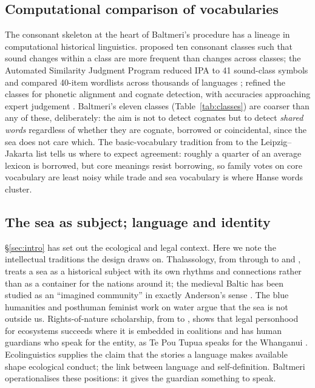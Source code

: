 \subsection{Computational comparison of vocabularies}\label{sec:related-comp}
The consonant skeleton at the heart of Baltmeri's procedure has a lineage in computational historical linguistics. \citet{dolgopolsky1986} proposed ten consonant classes such that sound changes within a class are more frequent than changes across classes; the Automated Similarity Judgment Program reduced IPA to 41 sound-class symbols and compared 40-item wordlists across thousands of languages \citep{brown2008,holman2008,wichmann2010,jaeger2018}; \citet{list2012,list2014} refined the classes for phonetic alignment and cognate detection, with accuracies approaching expert judgement \citep{list2017,rama2018}. Baltmeri's eleven classes (Table~\ref{tab:classes}) are coarser than any of these, deliberately: the aim is not to detect cognates but to detect \emph{shared words} regardless of whether they are cognate, borrowed or coincidental, since the sea does not care which. The basic-vocabulary tradition from \citet{swadesh1952,swadesh1955} to the Leipzig--Jakarta list \citep{tadmor2010,haspelmath2009} tells us where to expect agreement: roughly a quarter of an average lexicon is borrowed, but core meanings resist borrowing, so family votes on core vocabulary are least noisy while trade and sea vocabulary is where Hanse words cluster.

\subsection{The sea as subject; language and identity}\label{sec:related-sea}
\S\ref{sec:intro} has set out the ecological and legal context. Here we note the intellectual traditions the design draws on. Thalassology, from \citet{braudel1949} through \citet{horden2000,horden2006} to \citet{north2015} and \citet{kirby2000}, treats a sea as a historical subject with its own rhythms and connections rather than as a container for the nations around it; the medieval Baltic has been studied as an ``imagined community'' in exactly Anderson's sense \citep{jezierski2016,anderson2006}. The blue humanities \citep{mentz2009,gillis2012,steinberg2015} and posthuman feminist work on water \citep{neimanis2017,neimanis2017gotland} argue that the sea is not outside us. Rights-of-nature scholarship, from \citet{stone1972} to \citet{kauffman2021}, shows that legal personhood for ecosystems succeeds where it is embedded in coalitions and has human guardians who speak for the entity, as Te Pou Tupua speaks for the Whanganui \citep{teawatupua2017}. Ecolinguistics \citep{haugen1972,fill2001,stibbe2021} supplies the claim that the stories a language makes available shape ecological conduct; \citet{fishman1989} the link between language and self-definition. Baltmeri operationalises these positions: it gives the guardian something to speak.
